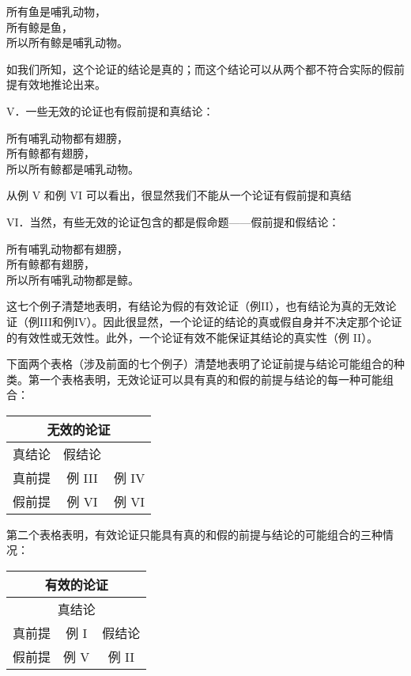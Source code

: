 所有鱼是哺乳动物，\\
所有鲸是鱼，\\
所以所有鲸是哺乳动物。

如我们所知，这个论证的结论是真的；而这个结论可以从两个都不符合实际的假前提有效地推论出来。

V．一些无效的论证也有假前提和真结论：

所有哺乳动物都有翅膀，\\
所有鲸都有翅膀，\\
所以所有鲸都是哺乳动物。

从例 V 和例 VI 可以看出，很显然我们不能从一个论证有假前提和真结

VI．当然，有些无效的论证包含的都是假命题——假前提和假结论：

所有哺乳动物都有翅膀，\\
所有鲸都有翅膀，\\
所以所有哺乳动物都是鲸。

这七个例子清楚地表明，有结论为假的有效论证（例II），也有结论为真的无效论证（例III和例IV）。因此很显然，一个论证的结论的真或假自身并不决定那个论证的有效性或无效性。此外，一个论证有效不能保证其结论的真实性（例 II）。

下面两个表格（涉及前面的七个例子）清楚地表明了论证前提与结论可能组合的种类。第一个表格表明，无效论证可以具有真的和假的前提与结论的每一种可能组合：

\begin{center}
\begin{tabular}{|c|c|c|}
\hline
\multicolumn{3}{|c|}{无效的论证} \\
\hline
真结论 & 假结论 &  \\
\hline
真前提 & 例 III & 例 IV \\
\hline
假前提 & 例 VI & 例 VI \\
\hline
\end{tabular}
\end{center}

第二个表格表明，有效论证只能具有真的和假的前提与结论的可能组合的三种情况：

\begin{center}
\begin{tabular}{|c|c|c|}
\hline
\multicolumn{3}{|c|}{有效的论证} \\
\hline
\multicolumn{3}{|c|}{真结论} \\
\hline
真前提 & 例 I & 假结论 \\
\hline
假前提 & 例 V & 例 II \\
\hline
\end{tabular}
\end{center}

